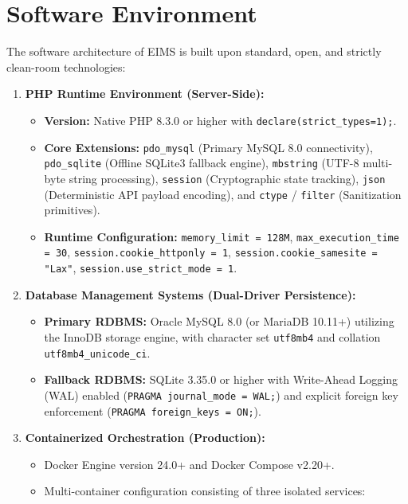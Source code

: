 \section{Software Environment}
\label{sec:req_software}
The software architecture of EIMS is built upon standard, open, and strictly clean-room technologies:

\begin{enumerate}[label=\textbf{SE\arabic*.}]
    \item \textbf{PHP Runtime Environment (Server-Side):}
    \begin{itemize}
        \item \textbf{Version:} Native PHP 8.3.0 or higher with \texttt{declare(strict\_types=1);}.
        \item \textbf{Core Extensions:} \texttt{pdo\_mysql} (Primary MySQL 8.0 connectivity), \texttt{pdo\_sqlite} (Offline SQLite3 fallback engine), \texttt{mbstring} (UTF-8 multi-byte string processing), \texttt{session} (Cryptographic state tracking), \texttt{json} (Deterministic API payload encoding), and \texttt{ctype} / \texttt{filter} (Sanitization primitives).
        \item \textbf{Runtime Configuration:} \texttt{memory\_limit = 128M}, \texttt{max\_execution\_time = 30}, \texttt{session.cookie\_httponly = 1}, \texttt{session.cookie\_samesite = "Lax"}, \texttt{session.use\_strict\_mode = 1}.
    \end{itemize}
    \item \textbf{Database Management Systems (Dual-Driver Persistence):}
    \begin{itemize}
        \item \textbf{Primary RDBMS:} Oracle MySQL 8.0 (or MariaDB 10.11+) utilizing the InnoDB storage engine, with character set \texttt{utf8mb4} and collation \texttt{utf8mb4\_unicode\_ci}.
        \item \textbf{Fallback RDBMS:} SQLite 3.35.0 or higher with Write-Ahead Logging (WAL) enabled (\texttt{PRAGMA journal\_mode = WAL;}) and explicit foreign key enforcement (\texttt{PRAGMA foreign\_keys = ON;}).
    \end{itemize}
    \item \textbf{Containerized Orchestration (Production):}
    \begin{itemize}
        \item Docker Engine version 24.0+ and Docker Compose v2.20+.
        \item Multi-container configuration consisting of three isolated services:

\end{itemize}
\end{enumerate}
